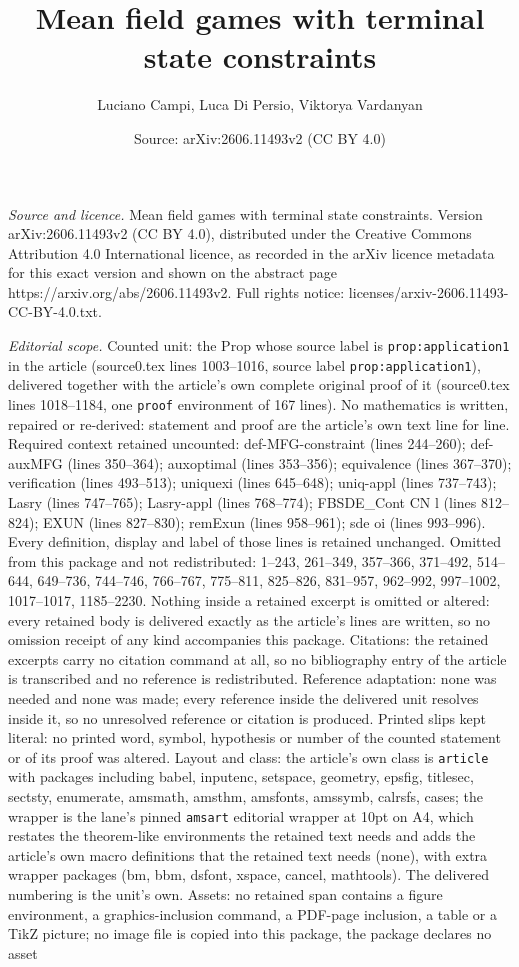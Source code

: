 \documentclass[10pt,a4paper]{amsart}
\title[Mean field games with terminal state constraints]{Mean field games with terminal state constraints}
\author{Luciano Campi, Luca Di Persio, Viktorya Vardanyan}
\date{Source: arXiv:2606.11493v2 (CC BY 4.0)}
\begin{document}
\maketitle

\noindent\emph{Source and licence.} Mean field games with terminal state constraints. Version arXiv:2606.11493v2 (CC BY 4.0), distributed under the Creative Commons Attribution 4.0 International licence, as recorded in the arXiv licence metadata for this exact version and shown on the abstract page https://arxiv.org/abs/2606.11493v2. Full rights notice: licenses/arxiv-2606.11493-CC-BY-4.0.txt.\par\smallskip

\noindent\textit{Editorial scope.} Counted unit: the Prop whose source label is \texttt{prop:application1} in the article (source0.tex lines 1003--1016, source label \texttt{prop:application1}), delivered together with the article's own complete original proof of it (source0.tex lines 1018--1184, one \texttt{proof} environment of 167 lines). No mathematics is written, repaired or re-derived: statement and proof are the article's own text line for line. Required context retained uncounted: def-MFG-constraint (lines 244--260); def-auxMFG (lines 350--364); auxoptimal (lines 353--356); equivalence (lines 367--370); verification (lines 493--513); uniquexi (lines 645--648); uniq-appl (lines 737--743); Lasry (lines 747--765); Lasry-appl (lines 768--774); FBSDE\_Cont CN l (lines 812--824); EXUN (lines 827--830); remExun (lines 958--961); sde oi (lines 993--996). Every definition, display and label of those lines is retained unchanged. Omitted from this package and not redistributed: 1--243, 261--349, 357--366, 371--492, 514--644, 649--736, 744--746, 766--767, 775--811, 825--826, 831--957, 962--992, 997--1002, 1017--1017, 1185--2230. Nothing inside a retained excerpt is omitted or altered: every retained body is delivered exactly as the article's lines are written, so no omission receipt of any kind accompanies this package. Citations: the retained excerpts carry no citation command at all, so no bibliography entry of the article is transcribed and no reference is redistributed. Reference adaptation: none was needed and none was made; every reference inside the delivered unit resolves inside it, so no unresolved reference or citation is produced. Printed slips kept literal: no printed word, symbol, hypothesis or number of the counted statement or of its proof was altered. Layout and class: the article's own class is \texttt{article} with packages including babel, inputenc, setspace, geometry, epsfig, titlesec, sectsty, enumerate, amsmath, amsthm, amsfonts, amssymb, calrsfs, cases; the wrapper is the lane's pinned \texttt{amsart} editorial wrapper at 10pt on A4, which restates the theorem-like environments the retained text needs and adds the article's own macro definitions that the retained text needs (none), with extra wrapper packages (bm, bbm, dsfont, xspace, cancel, mathtools). The delivered numbering is the unit's own. Assets: no retained span contains a figure environment, a graphics-inclusion command, a PDF-page inclusion, a table or a TikZ picture; no image file is copied into this package, the package declares no asset 
\end{document}
